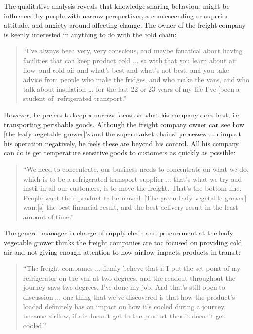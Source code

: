 The qualitative analysis reveals that knowledge-sharing behaviour might be influenced by people with narrow perspectives, a condescending or superior attitude, and anxiety around affecting change. The owner of the freight company is keenly interested in anything to do with the cold chain:

\begin{quote}
\small
\enquote{I've always been very, very conscious, and maybe fanatical about having facilities that can keep product cold ... so with that you learn about air flow, and cold air and what's best and what’s not best, and you take advice from people who make the fridges, and who make the vans, and who talk about insulation ... for the last 22 or 23 years of my life I've [been a student of] refrigerated transport.} \\
\end{quote}

However, he prefers to keep a narrow focus on what his company does best, i.e. transporting perishable goods. Although the freight company owner can see how [the leafy vegetable grower]'s and the supermarket chains' processes can impact his operation negatively, he feels these are beyond his control. All his company can do is get temperature sensitive goods to customers as quickly as possible:  

\begin{quote}
\small
\enquote{We need to concentrate, our business needs to concentrate on what we do, which is to be a refrigerated transport supplier ... that's what we try and instil in all our customers, is to move the freight. That's the bottom line. People want their product to be moved. [The green leafy vegetable grower] want[s] the best financial result, and the best delivery result in the least amount of time.} \\
\end{quote}

The general manager in charge of supply chain and procurement at the leafy vegetable grower thinks the freight companies are too focused on providing cold air and not giving enough attention to how airflow impacts products in transit:

\begin{quote}
\small
\enquote{The freight companies ... firmly believe that if I put the set point of my refrigerator on the van at two degrees, and the readout throughout the journey says two degrees, I've done my job. And that's still open to discussion ... one thing that we've discovered is that how the product's loaded definitely has an impact on how it's cooled during a journey, because airflow, if air doesn't get to the product then it doesn't get cooled.} \\
\end{quote}

